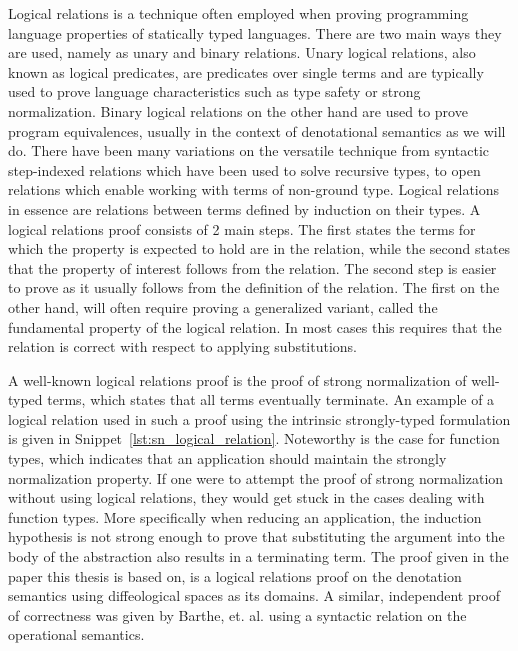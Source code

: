 \documentclass[11pt, final]{article}
\begin{document}
Logical relations is a technique often employed when proving programming language properties of statically typed languages\cite{skorstengaard2019introduction}. There are two main ways they are used, namely as unary and binary relations.
Unary logical relations, also known as logical predicates, are predicates over single terms and are typically used to prove language characteristics such as type safety or strong normalization.
Binary logical relations on the other hand are used to prove program equivalences, usually in the context of denotational semantics as we will do.
There have been many variations on the versatile technique from syntactic step-indexed relations which have been used to solve recursive types\cite{Ahmed2006}, to open relations which enable working with terms of non-ground type\cite{barthe2020versatility}\cite{huot2020correctness}.
Logical relations in essence are relations between terms defined by induction on their types.
A logical relations proof consists of 2 main steps.
The first states the terms for which the property is expected to hold are in the relation, while the second states that the property of interest follows from the relation.
The second step is easier to prove as it usually follows from the definition of the relation. The first on the other hand, will often require proving a generalized variant, called the fundamental property of the logical relation.
In most cases this requires that the relation is correct with respect to applying substitutions.

A well-known logical relations proof is the proof of strong normalization of well-typed terms, which states that all terms eventually terminate.
An example of a logical relation used in such a proof using the intrinsic strongly-typed formulation is given in Snippet~\ref{lst:sn_logical_relation}.
Noteworthy is the case for function types, which indicates that an application should maintain the strongly normalization property.
If one were to attempt the proof of strong normalization without using logical relations, they would get stuck in the cases dealing with function types.
More specifically when reducing an application, the induction hypothesis is not strong enough to prove that substituting the argument into the body of the abstraction also results in a terminating term.
The proof given in the paper this thesis is based on, is a logical relations proof on the denotation semantics using diffeological spaces as its domains\cite{huot2020correctness}.
A similar, independent proof of correctness was given by Barthe, et. al.\cite{barthe2020versatility} using a syntactic relation on the operational semantics.
\end{document}

